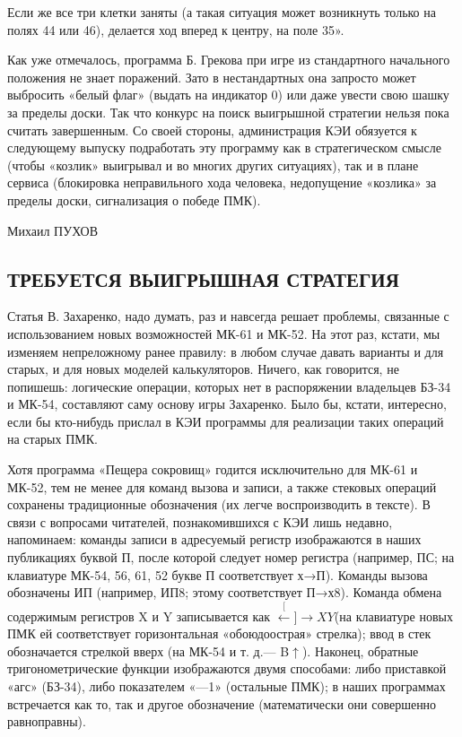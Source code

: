 \documentclass[11pt,a4paper,oneside]{article}
\def\XY{$\stackrel[\leftarrow]{\rightarrow}{XY}$}
\begin{document}
Если же все три клетки заняты (а такая ситуация может возникнуть только на полях 44 или 46), делается ход вперед к центру, на поле 35».

Как уже отмечалось, программа Б. Грекова при игре из стандартного начального положения не знает поражений. Зато в нестандартных она запросто может выбросить «белый флаг» (выдать на индикатор 0) или даже увести свою шашку за пределы доски. Так что конкурс на поиск выигрышной стратегии нельзя пока считать завершенным. Со своей стороны, администрация КЭИ обязуется к следующему выпуску подработать эту программу как в стратегическом смысле (чтобы «козлик» выигрывал и во многих других ситуациях), так и в плане сервиса (блокировка неправильного хода человека, недопущение «козлика» за пределы доски, сигнализация о победе ПМК).

Михаил ПУХОВ

\subsection{ТРЕБУЕТСЯ ВЫИГРЫШНАЯ СТРАТЕГИЯ}
Статья В. Захаренко, надо думать, раз и навсегда решает проблемы, связанные с использованием новых возможностей МК-61 и МК-52. На этот раз, кстати, мы изменяем непреложному ранее правилу: в любом случае давать варианты и для старых, и для новых моделей калькуляторов. Ничего, как говорится, не попишешь: логические операции, которых нет в распоряжении владельцев БЗ-34 и МК-54, составляют саму основу игры Захаренко. Было бы, кстати, интересно, если бы кто-нибудь прислал в КЭИ программы для реализации таких операций на старых ПМК. 

Хотя программа «Пещера сокровищ» годится исключительно для МК-61 и МК-52, тем не менее для команд вызова и записи, а также стековых операций сохранены традиционные обозначения (их легче воспроизводить в тексте). В связи с вопросами читателей, познакомившихся с КЭИ лишь недавно, напоминаем: команды записи в адресуемый регистр изображаются в наших публикациях буквой П, после которой следует номер регистра (например, ПС; на клавиатуре МК-54, 56, 61, 52 букве П соответствует х→П). Команды вызова обозначены ИП (например, ИП8; этому соответствует П→х8). Команда обмена содержимым регистров X и Y записывается как \XY (на клавиатуре новых ПМК ей соответствует горизонтальная «обоюдоострая» стрелка); ввод в стек обозначается стрелкой вверх (на МК-54 и т. д.— B$\uparrow$). Наконец, обратные тригонометрические функции изображаются двумя способами: либо приставкой «агс» (БЗ-34), либо показателем «—1» (остальные ПМК); в наших программах встречается как то, так и другое обозначение (математически они совершенно равноправны).
\end{document}
